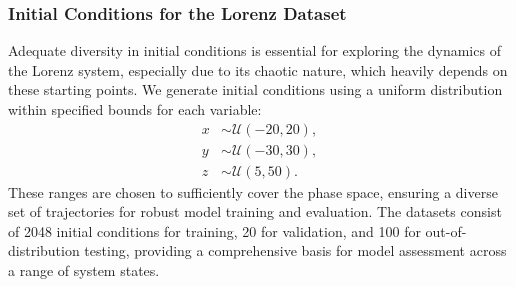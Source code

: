
\subsubsection{Initial Conditions for the Lorenz Dataset}
Adequate diversity in initial conditions is essential for exploring the dynamics of the Lorenz system, especially due to its chaotic nature, which heavily depends on these starting points. We generate initial conditions using a uniform distribution within specified bounds for each variable:
\begin{equation}
\begin{aligned}
    x &\sim \mathcal{U}(-20, 20), \\
    y &\sim \mathcal{U}(-30, 30), \\
    z &\sim \mathcal{U}(5, 50).
\end{aligned}
\end{equation}
These ranges are chosen to sufficiently cover the phase space, ensuring a diverse set of trajectories for robust model training and evaluation. The datasets consist of 2048 initial conditions for training, 20 for validation, and 100 for out-of-distribution testing, providing a comprehensive basis for model assessment across a range of system states.




